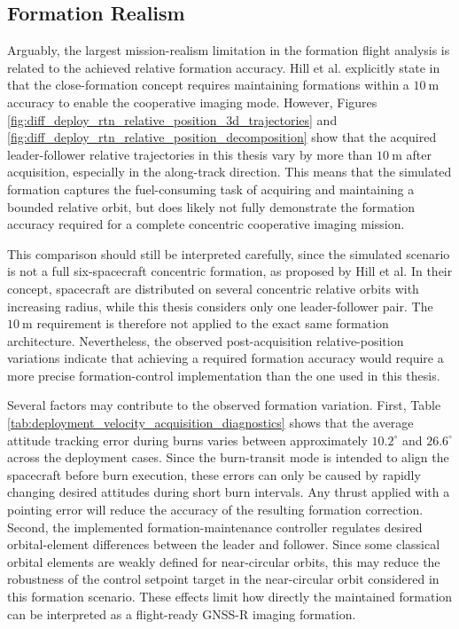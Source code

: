 \subsection{Formation Realism}

Arguably, the largest mission-realism limitation in the formation flight analysis is related to the achieved relative formation accuracy. Hill et al. explicitly state in \cite{hill2025hydroswarm} that the close-formation concept requires maintaining formations within a $10~\mathrm{m}$ accuracy to enable the cooperative imaging mode. However, Figures \ref{fig:diff_deploy_rtn_relative_position_3d_trajectories} and \ref{fig:diff_deploy_rtn_relative_position_decomposition} show that the acquired leader-follower relative trajectories in this thesis vary by more than $10~\mathrm{m}$ after acquisition, especially in the along-track direction. This means that the simulated formation captures the fuel-consuming task of acquiring and maintaining a bounded relative orbit, but does likely not fully demonstrate the formation accuracy required for a complete concentric cooperative imaging mission.

This comparison should still be interpreted carefully, since the simulated scenario is not a full six-spacecraft concentric formation, as proposed by Hill et al. In their concept, spacecraft are distributed on several concentric relative orbits with increasing radius, while this thesis considers only one leader-follower pair. The $10~\mathrm{m}$ requirement is therefore not applied to the exact same formation architecture. Nevertheless, the observed post-acquisition relative-position variations indicate that achieving a required formation accuracy would require a more precise formation-control implementation than the one used in this thesis.

Several factors may contribute to the observed formation variation. First, Table \ref{tab:deployment_velocity_acquisition_diagnostics} shows that the average attitude tracking error during burns varies between approximately $10.2^\circ$ and $26.6^\circ$ across the deployment cases. Since the burn-transit mode is intended to align the spacecraft before burn execution, these errors can only be caused by rapidly changing desired attitudes during short burn intervals. Any thrust applied with a pointing error will reduce the accuracy of the resulting formation correction. Second, the implemented formation-maintenance controller regulates desired orbital-element differences between the leader and follower. Since some classical orbital elements are weakly defined for near-circular orbits, this may reduce the robustness of the control setpoint target in the near-circular orbit considered in this formation scenario. These effects limit how directly the maintained formation can be interpreted as a flight-ready GNSS-R imaging formation.

